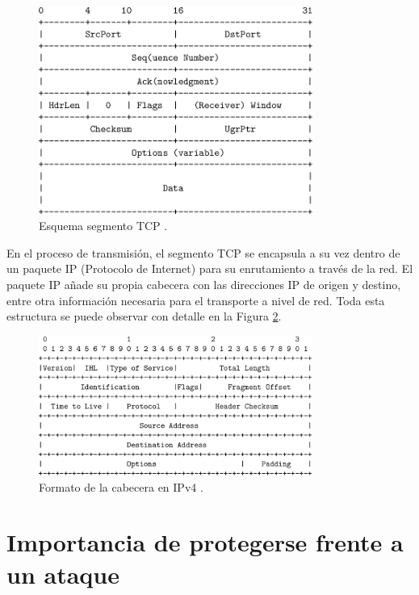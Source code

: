\begin{figure}[H]
    \centering
    \includegraphics[width=0.8\textwidth]{./img/ent-problema/SegmentoTCP.png}
    \caption{Esquema segmento TCP \cite{tcpsegment}.}
    \label{fig:SegmentoTCP}
\end{figure}

En el proceso de transmisión, el segmento TCP se encapsula a su vez dentro de un paquete IP (Protocolo de Internet) para su enrutamiento a través de la red. El paquete IP añade su propia cabecera con las direcciones IP de origen y destino, entre otra información necesaria para el transporte a nivel de red. Toda esta estructura se puede observar con detalle en la Figura \ref{fig:PaqueteIP}.

\begin{figure}[H]
    \centering
    \includegraphics[width=0.8\textwidth]{./img/ent-problema/PaqueteIP.png}
    \caption{Formato de la cabecera en IPv4 \cite{paqueteip}.}
    \label{fig:PaqueteIP}
\end{figure}

\section{Importancia de protegerse frente a un ataque}

